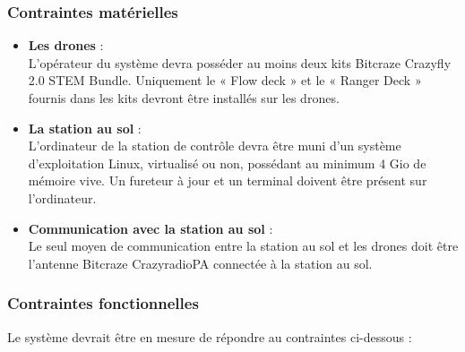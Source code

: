 \documentclass{mistcoursedoc}
\begin{document}
\subsubsection{Contraintes matérielles}
\begin{itemize}

  \item \textbf{Les drones} : \\
        L’opérateur du système devra posséder au moins deux kits Bitcraze Crazyfly 2.0 STEM Bundle.
        Uniquement le « Flow deck » et le « Ranger Deck » fournis dans les kits devront être installés sur les drones.

  \item \textbf{La station au sol} : \\
        L’ordinateur de la station de contrôle devra être muni d’un système d’exploitation
        Linux, virtualisé ou non, possédant au minimum 4 Gio de mémoire vive.
        Un fureteur à jour et un terminal doivent être présent sur l’ordinateur.

  \item \textbf{Communication avec la station au sol} : \\
        Le seul moyen de communication entre la station au sol et les drones doit être
        l’antenne Bitcraze CrazyradioPA connectée à la station au sol.

\end{itemize}

\subsubsection{Contraintes fonctionnelles}
Le système devrait être en mesure de répondre au contraintes ci-dessous :
\end{document}
